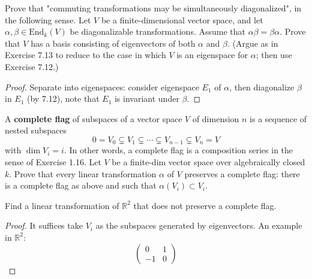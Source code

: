 \documentclass[openany]{book}
\newcommand{\R}{\mathbb{R}}
\begin{document}
\begin{prob}[7.14]
    Prove that "commuting transformations may be simultaneously diagonalized", in the following sense. Let \( V \) be a finite-dimensional vector space, and let \( \alpha, \beta \in \text{End}_k(V) \) be diagonalizable transformations. Assume that \( \alpha\beta = \beta\alpha \). Prove that \( V \) has a basis consisting of eigenvectors of both \( \alpha \) and \( \beta \). (Argue as in Exercise 7.13 to reduce to the case in which \( V \) is an eigenspace for \( \alpha \); then use Exercise 7.12.)
\end{prob}
\begin{proof}
    Separate into eigenspaces: consider eigenspace $E_1$ of $\alpha$, then diagonalize $\beta$ in $E_1$ (by 7.12), note that $E_1$ is invariant under $\beta$.
\end{proof}

\begin{prob}[7.15]
    A \textbf{complete flag} of subspaces of a vector space \( V \) of dimension \( n \) is a sequence of nested subspaces
\[
0 = V_0 \subsetneq V_1 \subsetneq \cdots \subsetneq V_{n-1} \subsetneq V_n = V
\]
with \(\dim V_i = i\). In other words, a complete flag is a composition series in the sense of Exercise 1.16. Let $V$ be a finite-dim vector space over algebraically closed $k$. Prove that every linear transformation $\alpha$ of $V$ preserves a complete flag: there is a complete flag as above and such that $\alpha(V_i)\subset V_i$.

Find a linear transformation of $\R^2$ that does not preserve a complete flag.
\end{prob}

\begin{proof}
    It suffices take $V_i$ as the subspaces generated by eigenvectors.
    An example in $\R^2$:
    \begin{equation*}
        \begin{pmatrix}
            0&1\\
            -1&0
        \end{pmatrix}
    \end{equation*}

\end{proof}
\end{document}
